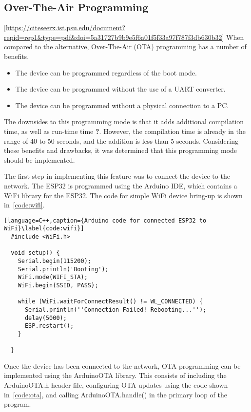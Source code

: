 \subsection{Over-The-Air Programming}
\ref{https://citeseerx.ist.psu.edu/document?repid=rep1&type=pdf&doi=5a31727b9b9e5f6a01f5f33a97f787f3db630b32}
When compared to the alternative, Over-The-Air (OTA) programming has a number of benefits.

\begin{itemize}
        \item The device can be programmed regardless of the boot mode.
        \item The device can be programmed without the use of a UART converter.
        \item The device can be programmed without a physical connection to a PC.
\end{itemize}

The downsides to this programming mode is that it adds additional compilation time, as well as run-time time \textbf{?}.
However, the compilation time is already in the range of 40 to 50 seconds, and the addition is less than 5 seconds.
Considering these benefits and drawbacks, it was determined that this programming mode should be implemented.

The first step in implementing this feature was to connect the device to the network.
The ESP32 is programmed using the Arduino IDE, which contains a WiFi library for the ESP32.
The code for simple WiFi device bring-up is shown in~\autoref{code:wifi}.

\begin{lstlisting}[language=C++,caption={Arduino code for connected ESP32 to WiFi}\label{code:wifi}]
  #include <WiFi.h>

  void setup() {
    Serial.begin(115200);
    Serial.println('Booting');
    WiFi.mode(WIFI_STA);
    WiFi.begin(SSID, PASS);

    while (WiFi.waitForConnectResult() != WL_CONNECTED) {
      Serial.println(''Connection Failed! Rebooting...'');
      delay(5000);
      ESP.restart();
    }

  }
\end{lstlisting}

Once the device has been connected to the network, OTA programming can be implemented using the ArduinoOTA library.
This consists of including the ArduinoOTA.h header file,
configuring OTA updates using the code shown in~\autoref{code:ota},
and calling ArduinoOTA.handle() in the primary loop of the program.

